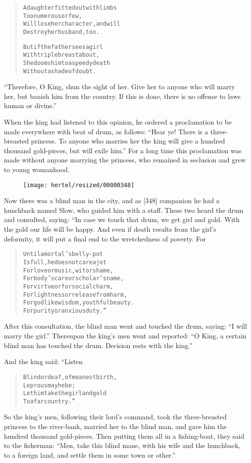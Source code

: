 \documentclass[article, twoside, 10pt]{memoir}
\renewenvironment{verbatim}{%
\begin{quote}%
\vskip -10pt%
\begin{alltt}\normalfont\small}{\end{alltt}%
\end{quote}%
\vskip -10pt
} %
\begin{document}
\begin{verbatim}
A daughter fitted out with limbs
    Too numerous or few,
Will lose her character, and will
    Destroy her husband, too.

But if the father sees a girl
    With triple breast about,
She dooms him to a speedy death
    Without a shade of doubt.
\end{verbatim}
``Therefore, O King, shun the sight of her. Give her to anyone who will marry her, but banish him from the country. If this is done, there is no offense to laws human or divine.''

When the king had listened to this opinion, he ordered a
proclamation to be made everywhere with beat of drum, as follows:
``Hear ye! There is a three-breasted princess. To anyone who marries her the king will give a hundred thousand gold-pieces, but will exile him.''
For a long time this proclamation was made without anyone marrying
the princess, who remained in seclusion and grew to young
womanhood.

\begin{figure}[p]\texttt{[image: hertel/resized/00000348]}\end{figure}Now there was a blind man in the city, and as [348] companion he
had a hunchback named Slow, who guided him with a staff. These two
heard the drum and consulted, saying: “In case we touch that drum,
we get girl and gold. With the gold our life will be happy. And
even if death results from the girl's deformity, it will put a
final end to the wretchedness of poverty. For

\begin{verbatim}
Until a mortal's belly-pot
Is full, he does not care a jot
For love or music, wit or shame,
For body's care or scholar's name,
For virtue or for social charm,
For lightness or release from harm,
For godlike wisdom, youthful beauty.
For purity or anxious duty.”
\end{verbatim}
After this consultation, the blind man went and touched the drum,
saying: ``I will marry the girl.'' Thereupon the king's men went
and reported:
``O King, a certain blind man has touched the drum. Decision rests with the king.''

And the king said: “Listen

\begin{verbatim}
Blind or deaf, of meanest birth,
    Leprous may he be;
Let him take the girl and gold
    To a far country.”
\end{verbatim}
So the king's men, following their lord's command, took the
three-breasted princess to the river-bank, married her to the blind
man, and gave him the hundred thousand gold-pieces. Then putting
them all in a fishing-boat, they said to the fisherman:
``Men, take this blind mane, with his wife and the hunchback, to a foreign land, and settle them in some town or other.''
\end{document}
